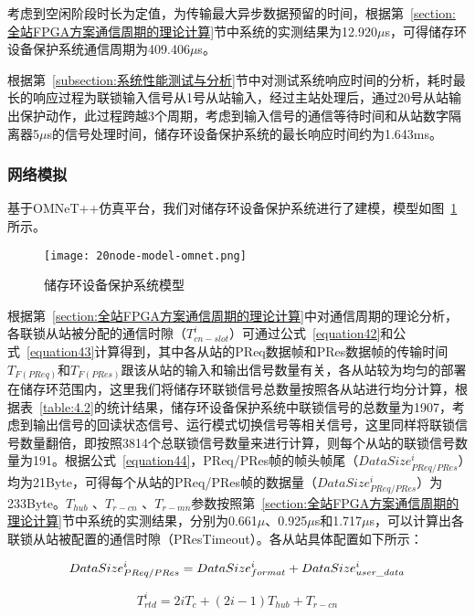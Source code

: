 考虑到空闲阶段时长为定值，为传输最大异步数据预留的时间，根据第~\ref{section:全站FPGA方案通信周期的理论计算}节中系统的实测结果为12.920$\mu$s，可得储存环设备保护系统通信周期为409.406$\mu$s。


根据第~\ref{subsection:系统性能测试与分析}节中对测试系统响应时间的分析，耗时最长的响应过程为联锁输入信号从1号从站输入，经过主站处理后，通过20号从站输出保护动作，此过程跨越3个周期，考虑到输入信号的通信等待时间和从站数字隔离器5$\mu$s的信号处理时间，储存环设备保护系统的最长响应时间约为1.643ms。

\subsubsection{网络模拟}

基于OMNeT++仿真平台，我们对储存环设备保护系统进行了建模，模型如图~\ref{fig:20node-model-omnet}所示。

\begin{figure}[!htb]
  \centering
  \texttt{[image: 20node-model-omnet.png]}
  \caption{储存环设备保护系统模型}
  \label{fig:20node-model-omnet}
\end{figure}

根据第~\ref{section:全站FPGA方案通信周期的理论计算}中对通信周期的理论分析，各联锁从站被分配的通信时隙（$T_{cn-slot}^{i}$）可通过公式~\ref{equation42}和公式~\ref{equation43}计算得到，其中各从站的PReq数据帧和PRes数据帧的传输时间$T_{F(PReq)}$和$T_{F(PRes)}$跟该从站的输入和输出信号数量有关，各从站较为均匀的部署在储存环范围内，这里我们将储存环联锁信号总数量按照各从站进行均分计算，根据表~\ref{table:4.2}的统计结果，储存环设备保护系统中联锁信号的总数量为1907，考虑到输出信号的回读状态信号、运行模式切换信号等相关信号，这里同样将联锁信号数量翻倍，即按照3814个总联锁信号数量来进行计算，则每个从站的联锁信号数量为191。根据公式~\ref{equation44}，PReq/PRes帧的帧头帧尾（$DataSize_{PReq/PRes}^{i}$）均为21Byte，可得每个从站的PReq/PRes帧的数据量（$DataSize_{PReq/PRes}^{i}$）为233Byte。$T_{hub}$ 、$T_{r-cn}$ 、$T_{r-mn}$参数按照第~\ref{section:全站FPGA方案通信周期的理论计算}节中系统的实测结果，分别为0.661$\mu$、0.925$\mu$s和1.717$\mu$s，可以计算出各联锁从站被配置的通信时隙（PResTimeout）。各从站具体配置如下所示：

\begin{equation}
\label{equation41}
DataSize_{PReq/PRes}^{i} = DataSize_{format}^{i}+DataSize_{user\_data}^{i}\\
\end{equation}

\begin{equation}
\label{equation42}
T_{rtd}^{i}=2iT_{c}+(2i-1)T_{hub}+T_{r-cn}
\end{equation}

